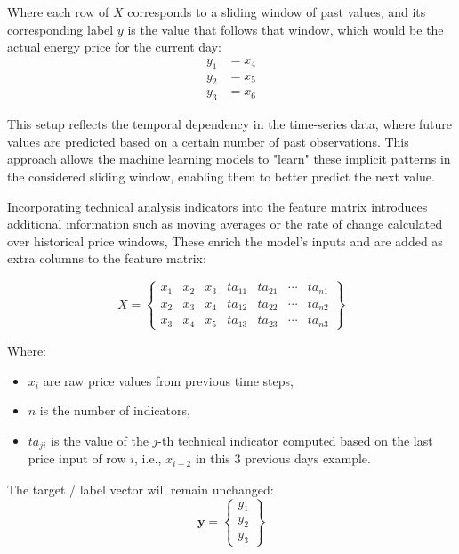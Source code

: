 \documentclass[12pt]{report} %
\begin{document}
Where each row of $\mathit{X}$ corresponds to a sliding window of past values, and its corresponding label $\mathit{y}$ is the value that follows that window, which would be the actual energy price for the current day:
\begin{align*}
y_1 &= x_4 \\
y_2 &= x_5 \\
y_3 &= x_6
\end{align*}

This setup reflects the temporal dependency in the time-series data, where future values are predicted based on a certain number of past observations. This approach allows the machine learning models to "learn" these implicit patterns in the considered sliding window, enabling them to better predict the next value.

Incorporating technical analysis indicators into the feature matrix introduces additional information such as moving averages or the rate of change calculated over historical price windows, These enrich the model’s inputs and are added as extra columns to the feature matrix:

\begin{equation*}
{X} = \begin{Bmatrix}
x_1 & x_2 & x_3 & ta_{11} & ta_{21} & \cdots & ta_{n1}\\
x_2 & x_3 & x_4 & ta_{12} & ta_{22} & \cdots & ta_{n2}\\
x_3 & x_4 & x_5 & ta_{13} & ta_{23} & \cdots & ta_{n3}
\end{Bmatrix}
\end{equation*}

Where:
\begin{itemize}
    \item $x_i$ are raw price values from previous time steps,
    \item $n$ is the number of indicators,
    \item $ta_{ji}$ is the value of the $j$-th technical indicator computed based on the last price input of row $i$, i.e., $x_{i+2}$ in this 3 previous days example.
\end{itemize}

The target / label vector will remain unchanged:
\begin{equation*}
\mathbf{y} = \begin{Bmatrix}
y_1 \\
y_2 \\
y_3
\end{Bmatrix}
\end{equation*}
\end{document}
